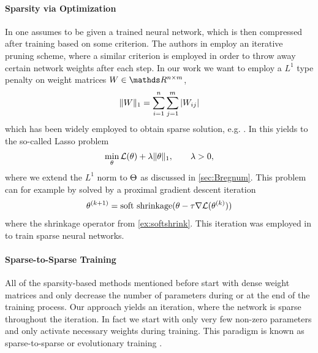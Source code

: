 \paragraph{Sparsity via Optimization} In \cite{lecun1989optimal, hassibi1993optimal} one assumes to be given a trained neural network, which is then compressed after training based on some criterion. The authors in \cite{castellano1997iterative} employ an iterative pruning scheme, where a similar criterion is employed in order to throw away certain network weights after each step. In our work we want to employ a $L^1$ type penalty on weight matrices $W\in\R^{n\times m}$,
%
\begin{align*}
\|W\|_1 = \sum_{i=1}^n\sum_{j=1}^m \left|W_{ij}\right|
\end{align*}
%
which has been widely employed to obtain sparse solution, e.g. \cite{claerbout1973robust}. In \cite{tibshirani1996regression} this yields to the so-called Lasso problem
%
\begin{align*}
\min_\theta \mathcal{L}(\theta) + \lambda \|\theta\|_1,\qquad \lambda >0,
\end{align*}
%
where we extend the $L^1$ norm to $\Theta$ as discussed in \cref{sec:Bregnum}. This problem can for example by solved by a proximal gradient descent iteration
%
\begin{align}\label{eq:proxgd}
\theta^{(k+1)} = \operatorname{soft\ shrinkage}(\theta - \tau \nabla\mathcal{L}(\theta^{(k)}))
\end{align}
%
where the shrinkage operator from \cref{ex:softshrink}. This iteration was employed in \cite{nitanda2014stochastic, rosasco2014convergence, reddi2016proximal} to train sparse neural networks.
%
%
\paragraph{Sparse-to-Sparse Training} All of the sparsity-based methods mentioned before start with dense weight matrices and only decrease the number of parameters during or at the end of the training process. Our approach yields an iteration, where the network is sparse throughout the iteration. In fact we start with only very few non-zero parameters and only activate necessary weights during training. This paradigm is known as sparse-to-sparse or evolutionary training \cite{mocanu2018scalable, dettmers2019sparse, Evci2020, dai2019nest, fu2019exploring, huang2016split, liu2021}.
%
%

